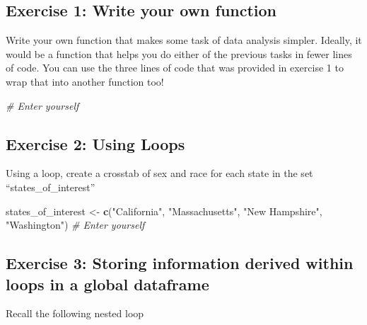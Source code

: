 \documentclass[]{book}
\newenvironment{Shaded}{\begin{snugshade}}{\end{snugshade}}
\newcommand{\KeywordTok}[1]{\textcolor[rgb]{0.13,0.29,0.53}{\textbf{#1}}}
\newcommand{\StringTok}[1]{\textcolor[rgb]{0.31,0.60,0.02}{#1}}
\newcommand{\CommentTok}[1]{\textcolor[rgb]{0.56,0.35,0.01}{\textit{#1}}}
\newcommand{\NormalTok}[1]{#1}
\theoremstyle{definition}
\theoremstyle{definition}
\theoremstyle{definition}
\theoremstyle{remark}
\begin{document}
\subsection*{Exercise 1: Write your own
function}\label{exercise-1-write-your-own-function}

Write your own function that makes some task of data analysis simpler.
Ideally, it would be a function that helps you do either of the previous
tasks in fewer lines of code. You can use the three lines of code that
was provided in exercise 1 to wrap that into another function too!

\begin{Shaded}
\begin{Highlighting}[]
\CommentTok{# Enter yourself}
\end{Highlighting}
\end{Shaded}

\subsection*{Exercise 2: Using Loops}\label{exercise-2-using-loops}

Using a loop, create a crosstab of sex and race for each state in the
set ``states\_of\_interest''

\begin{Shaded}
\begin{Highlighting}[]
\NormalTok{states_of_interest <-}\StringTok{ }\KeywordTok{c}\NormalTok{(}\StringTok{"California"}\NormalTok{, }\StringTok{"Massachusetts"}\NormalTok{, }\StringTok{"New Hampshire"}\NormalTok{, }\StringTok{"Washington"}\NormalTok{)}
\CommentTok{# Enter yourself}
\end{Highlighting}
\end{Shaded}

\subsection*{Exercise 3: Storing information derived within loops in a
global
dataframe}\label{exercise-3-storing-information-derived-within-loops-in-a-global-dataframe}

Recall the following nested loop
\end{document}
